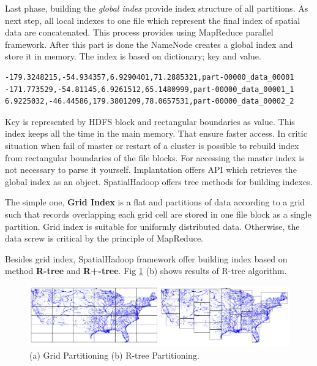 \documentclass[a4paper,12pt,oneside]{report}
\begin{document}
Last phase, building the \textit{global index} provide index structure of all partitions. As next step, 
 all local indexes to one file which represent the final index of spatial data are concatenated. This process 
provides using MapReduce parallel framework.  After this part is done the NameNode creates a global index
and store it in memory. The index is based on dictionary; key and value.

\begin{footnotesize}
\begin{lstlisting}[style=mybash]
-179.3248215,-54.934357,6.9290401,71.2885321,part-00000_data_00001
-171.773529,-54.81145,6.9261512,65.1480999,part-00000_data_00001_1
6.9225032,-46.44586,179.3801209,78.0657531,part-00000_data_00002_2
\end{lstlisting}\end{footnotesize}


 Key is represented by HDFS block and  rectangular boundaries as value. This index keeps all the 
 time in the main memory. That ensure faster access. In critic situation when fail of master or 
 restart of a cluster is possible to rebuild index from rectangular boundaries of the file blocks. 
 For accessing the master index is not necessary to parse it yourself. Implantation offers API 
 which retrieves the global index as an object.
SpatialHadoop offers tree methods for building indexes. 

The simple one, \textbf{Grid Index} is a flat and partitions of
data according to a grid such that records overlapping each grid cell are stored in one file block 
as a single partition. Grid index is suitable for uniformly distributed data. Otherwise, the data 
screw is critical by the principle of MapReduce. 

Besides grid index, SpatialHadoop framework offer building index based on method \textbf{R-tree} and 
\textbf{ R+-tree}. Fig \ref{fig:partitioning} (b) shows results of R-tree algorithm. 

  \begin{figure}[h!]
	\centering
    \includegraphics[width=1\textwidth]{./img/spatial_hadoop_parti.png}
    \caption[Spatial Map Reduce]{\centering (a) Grid Partitioning (b) R-tree Partitioning.\footnotemark}
    \label{fig:partitioning}
  \end{figure}  
    
\end{document}
